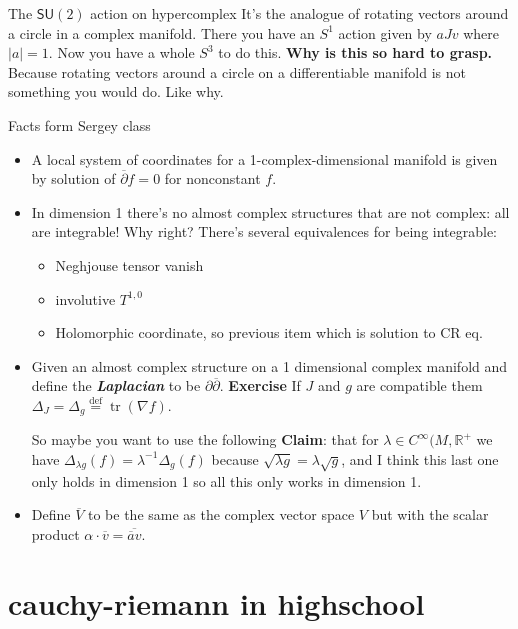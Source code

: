 \begin{thing7}{The \(\mathsf{SU}(2)\) action on hypercomplex}\leavevmode
It's the analogue of rotating vectors around a circle in a complex manifold. There you have an \(S^1\) action given by \(a Jv\) where \(|a|=1\). Now you have a whole  \(S^3\) to do this. \textbf{Why is this so hard to grasp.} Because rotating vectors around a circle on a differentiable manifold is not something you would do. Like why.
\end{thing7}

\begin{thing6}{Facts form Sergey class}\leavevmode
\begin{itemize}
	\item A local system of coordinates for a 1-complex-dimensional manifold is given by solution of  \(\overline{\partial}f=0\) for nonconstant \(f\).
	\item In dimension 1 there's no almost complex structures that are not complex: all are integrable! Why right? There's several equivalences for being integrable:
\begin{itemize}
\item Neghjouse tensor vanish
\item involutive \(T^{1,0}\) 
\item Holomorphic coordinate, so previous item which is solution to CR eq.
\end{itemize}
\item Given an almost complex structure on a 1 dimensional complex manifold and define the \textit{\textbf{Laplacian}} to be \(\partial \overline{\partial}\). \textbf{Exercise} If \(J\) and \(g\) are compatible them \(\Delta_J = \Delta_g\overset{\operatorname{def}}{=}\operatorname{tr}(\nabla f)\).

	So maybe you want to use the following \textbf{Claim}: that for \(\lambda \in C^\infty(M,\mathbb{R}^+\) we have \(\Delta_{\lambda g}(f)=\lambda^{-1}\Delta_g(f)\) because \(\sqrt{\lambda g}=\lambda \sqrt{g}  \), and I think this last one only holds in dimension 1 so all this only works in dimension 1.

\item Define \(\overline{V}\) to be the same as the complex vector space \(V\) but with the scalar product \(\alpha\cdot \overline{v}=\overline{\overline{a}v}\).
\end{itemize}
\end{thing6}


\section{cauchy-riemann in highschool}

